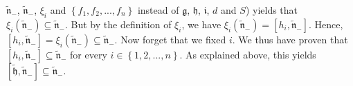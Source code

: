 \documentclass[etingof-lie.tex]{subfiles}
\begin{document}
\begin{vershort}
$\widetilde{\mathfrak{n}}_{-}$, $\widetilde{\mathfrak{n}}_{-}$, $\xi_{i}$ and
$\left\{  f_{1},f_{2},...,f_{n}\right\}  $ instead of $\mathfrak{g}$,
$\mathfrak{h}$, $\mathfrak{i}$, $d$ and $S$) yields that $\xi_{i}\left(
\widetilde{\mathfrak{n}}_{-}\right)  \subseteq\widetilde{\mathfrak{n}}_{-}$.
But by the definition of $\xi_{i}$, we have $\xi_{i}\left(
\widetilde{\mathfrak{n}}_{-}\right)  =\left[  h_{i},\widetilde{\mathfrak{n}%
}_{-}\right]  $. Hence, $\left[  h_{i},\widetilde{\mathfrak{n}}_{-}\right]
=\xi_{i}\left(  \widetilde{\mathfrak{n}}_{-}\right)  \subseteq
\widetilde{\mathfrak{n}}_{-}$. Now forget that we fixed $i$. We thus have
proven that $\left[  h_{i},\widetilde{\mathfrak{n}}_{-}\right]  \subseteq
\widetilde{\mathfrak{n}}_{-}$ for every $i\in\left\{  1,2,...,n\right\}  $. As
explained above, this yields $\left[  \widetilde{\mathfrak{h}}%
,\widetilde{\mathfrak{n}}_{-}\right]  \subseteq\widetilde{\mathfrak{n}}_{-}$.
\end{vershort}
\end{document}
